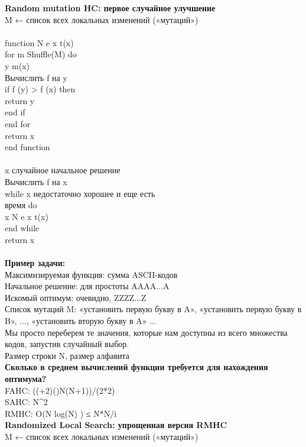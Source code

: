 \textbf{Random mutation HC: первое случайное улучшение}\\
M ← список всех локальных изменений («мутаций») \\
\\
function N e x t(x)  \\
\tab for m \leftarrow Shuffle(M) do\\  
\tab \tab y \leftarrow m(x)\\  
\tab \tab Вычислить f на y\\  
\tab \tab if f (y) > f (x) then\\  
\tab \tab \tab return y\\   
\tab \tab end if\\  
\tab end for\\  
\tab return x\\  
end function \\ 
\\
x \leftarrow случайное начальное решение\\  
Вычислить f на x\\  
while x недостаточно хорошее и еще есть\\  
время do \\ 
\tab x \leftarrow N e x t(x)\\  
end while \\
 return x \\
\\
\textbf{Пример задачи:}\\
Максимизируемая функция: сумма ASCII-кодов\\
Начальное решение: для простоты AAAA...A\\
Искомый оптимум: очевидно, ZZZZ...Z\\
Список мутаций M: «установить первую букву в A», «установить первую букву в B», ..., «установить вторую букву в A» ...\\
Мы просто переберем те значения, которые нам доступны из всего множества кодов, запустив случайный выбор. \\
Размер строки N, размер алфавита \Sigma \\

\textbf{Сколько в среднем вычислений функции требуется для нахождения оптимума?}\\
FAHC: ((\Sigma +2)()N(N+1))/(2*2)\\
SAHC: \Sigma N^2 \\
RMHC: O(\Sigma N log⁡(\Sigma N) ) ≤ \Sigma N*\Sigma N/i\\

\textbf{Randomized Local Search: упрощенная версия RMHC}\\
M ← список всех локальных изменений («мутаций») \\

